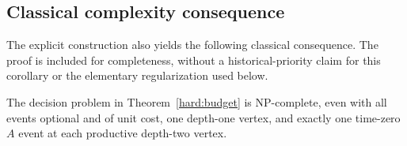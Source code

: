 \subsection{Classical complexity consequence}

The explicit construction also yields the following classical consequence.
The proof is included for completeness, without a historical-priority claim
for this corollary or the elementary regularization used below.

\begin{corollary}
\label{full:np-complete}
The decision problem in Theorem~\ref{hard:budget} is NP-complete, even with
all events optional and of unit cost, one depth-one vertex, and exactly
one time-zero \(A\) event at each productive depth-two vertex.
\end{corollary}

